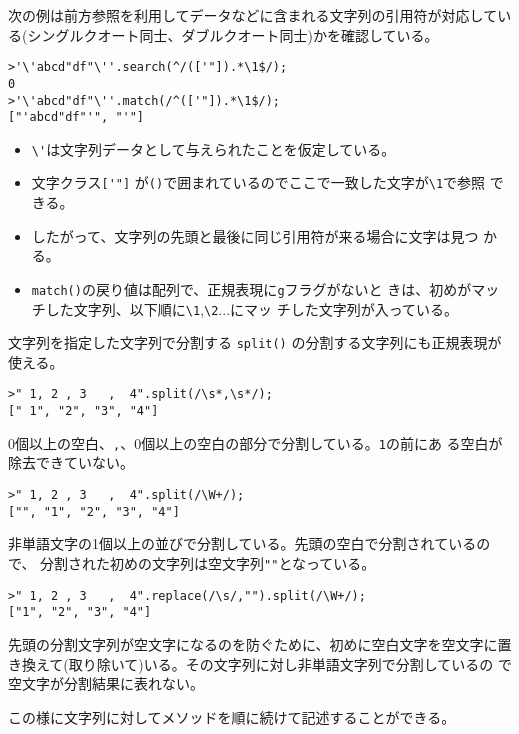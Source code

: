 \begin{Exec}
\iffalse\else
次の例は前方参照を利用してデータなどに含まれる文字列の引用符が対応してい
 る(シングルクオート同士、ダブルクオート同士)かを確認している。
\begin{Verbatim}
>'\'abcd"df"\''.search(^/(['"]).*\1$/);
0
>'\'abcd"df"\''.match(/^(['"]).*\1$/);
["'abcd"df"'", "'"]
\end{Verbatim}
\begin{itemize}
 \item \Verb+\'+は文字列データとして与えられたことを仮定している。
 \item 文字クラス\Verb+['"]+%
       が\Verb+()+で囲まれているのでここで一致した文字が\Verb+\1+で参照
       できる。
 \item したがって、文字列の先頭と最後に同じ引用符が来る場合に文字は見つ
       かる。
 \item \Verb+match()+の戻り値は配列で、正規表現に\Verb+g+フラグがないと
       きは、初めがマッチした文字列、以下順に\Verb+\1+,\Verb+\2+...にマッ
       チした文字列が入っている。
\end{itemize}
\fi
\end{Exec}
\begin{Exec}\upshape
 文字列を指定した文字列で分割する \Verb+split()+ の分割する文字列にも正規表現が使える。
\begin{Verbatim}
>" 1, 2 , 3   ,  4".split(/\s*,\s*/);
[" 1", "2", "3", "4"]
\end{Verbatim}
$0$個以上の空白、\Verb+,+、$0$個以上の空白の部分で分割している。\Verb+1+の前にあ
 る空白が除去できていない。
\begin{Verbatim}
>" 1, 2 , 3   ,  4".split(/\W+/);
["", "1", "2", "3", "4"]
\end{Verbatim}
非単語文字の1個以上の並びで分割している。先頭の空白で分割されているので、
 分割された初めの文字列は空文字列\Verb+""+となっている。
\begin{Verbatim}
>" 1, 2 , 3   ,  4".replace(/\s/,"").split(/\W+/);
["1", "2", "3", "4"]
\end{Verbatim}
先頭の分割文字列が空文字になるのを防ぐために、初めに空白文字を空文字に置
 き換えて(取り除いて)いる。その文字列に対し非単語文字列で分割しているの
 で空文字が分割結果に表れない。

この様に文字列に対してメソッドを順に続けて記述することができる。
\end{Exec}
